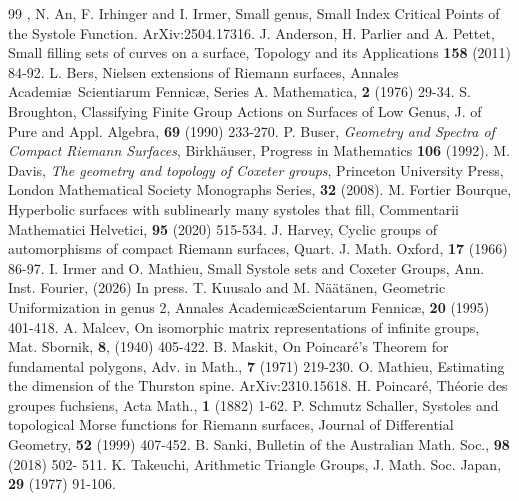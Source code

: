 \documentclass[10pt,a4paper]{amsart}
\begin{document}
\begin{thebibliography}{99}
 , N. An, F. Irhinger and I. Irmer, Small genus, Small Index Critical Points of the Systole Function. ArXiv:2504.17316.
 J. Anderson, H. Parlier and A. Pettet, Small filling sets of curves on a surface, Topology and its Applications {\bf 158} (2011) 84-92.
 L. Bers, Nielsen extensions of Riemann surfaces, Annales Academi\ae \ Scientiarum Fennic\ae, Series A. Mathematica, {\bf 2} (1976) 29-34.
 S. Broughton, Classifying Finite Group Actions on Surfaces of Low Genus, J. of Pure and Appl. Algebra, {\bf 69} (1990) 233-270.
 P. Buser, {\it Geometry and Spectra of Compact Riemann Surfaces}, Birkh{\"a}user, Progress in Mathematics {\bf 106} (1992).
 M. Davis, {\it The geometry and topology of {C}oxeter groups}, Princeton University Press, London Mathematical Society Monographs Series, {\bf 32} (2008).
 M. Fortier Bourque, Hyperbolic surfaces with sublinearly many systoles that fill, Commentarii Mathematici Helvetici, {\bf 95} (2020) 515-534.
 J. Harvey, Cyclic groups of automorphisms of compact Riemann surfaces, Quart. J. Math. Oxford, {\bf 17} (1966) 86-97.
 I. Irmer and O. Mathieu, Small Systole sets and Coxeter Groups, Ann. Inst. Fourier, (2026) In press.
 T. Kuusalo and M. N\"a\"at\"anen, Geometric Uniformization in genus 2, Annales Academic\ae Scientarum Fennic\ae, {\bf 20} (1995) 401-418.
 A. Malcev, On isomorphic matrix representations of infinite groups, Mat. Sbornik, {\bf 8}, (1940) 405-422.
 B. Maskit, On Poincar\'e's Theorem for fundamental polygons, Adv. in Math., {\bf 7} (1971) 219-230.
 O. Mathieu, Estimating the dimension of the Thurston spine. ArXiv:2310.15618.
 H. Poincar\'e, Th\'eorie des groupes fuchsiens, Acta Math., {\bf 1} (1882) 1-62.
 P. Schmutz Schaller, Systoles and topological Morse functions for Riemann surfaces, Journal of Differential Geometry, {\bf 52} (1999) 407-452.
 B. Sanki, Bulletin of the Australian Math. Soc., {\bf 98} (2018) 502- 511.
 K. Takeuchi, Arithmetic Triangle Groups, J. Math. Soc. Japan, {\bf 29} (1977) 91-106.
\end{thebibliography}
\end{document}
